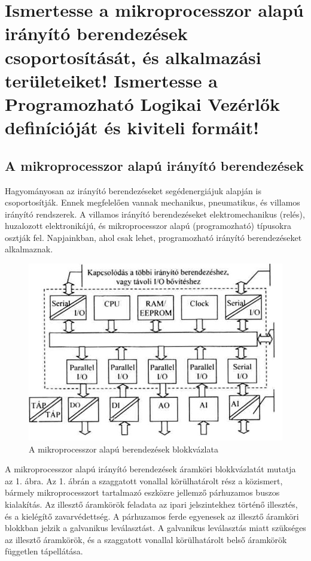 \documentclass[11pt,a4paper]{article}
\begin{document}
\noindent
\section{Ismertesse a mikroprocesszor alapú irányító berendezések csoportosítását, és alkalmazási területeiket! Ismertesse a Programozható Logikai Vezérlők definícióját és kiviteli formáit!}
	\subsection{A mikroprocesszor alapú irányító berendezések}
Hagyományosan az irányító berendezéseket segédenergiájuk alapján is  csoportosítják. Ennek megfelelően vannak mechanikus, pneumatikus, és villamos irányító rendszerek. A villamos irányító berendezéseket elektromechanikus (relés), huzalozott elektronikájú, és mikroprocesszor alapú (programozható) típusokra osztják fel. Napjainkban, ahol csak lehet, programozható irányító berendezéseket alkalmaznak.
\begin{figure}[hbtp]
    	 \centering
		\includegraphics[scale=1.0]{1_mikroproc_blokk.png}
		\caption{A mikroprocesszor alapú berendezések blokkvázlata}
\end{figure}
A mikroprocesszor alapú irányító berendezések áramköri blokkvázlatát mutatja az 1. ábra. Az 1. ábrán a szaggatott vonallal körülhatárolt rész a közismert, bármely mikroprocesszort tartalmazó eszközre jellemző párhuzamos  buszos kialakítás.
Az illesztő áramkörök feladata az ipari jelszintekhez történő illesztés, és  a kielégítő zavarvédettség. A párhuzamos ferde egyenesek az illesztő áramköri blokkban jelzik a galvanikus leválasztást. A galvanikus leválasztás miatt szükséges az illesztő áramkörök, és a szaggatott vonallal körülhatárolt belső áramkörök független tápellátása.
\end{document}
